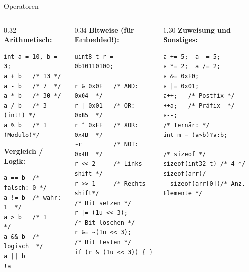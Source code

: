 \documentclass[%
  aspectratio=169,
  10pt
]{beamer}
\begin{document}
\begin{frame}[fragile]{Operatoren}
  \begin{columns}[T]
    \begin{column}{0.32\textwidth}
      \textbf{Arithmetisch:}
\begin{lstlisting}
int a = 10, b = 3;
a + b   /* 13 */
a - b   /* 7  */
a * b   /* 30 */
a / b   /* 3 (int!) */
a % b   /* 1 (Modulo)*/
\end{lstlisting}
      \textbf{Vergleich / Logik:}
\begin{lstlisting}
a == b  /* falsch: 0 */
a != b  /* wahr: 1  */
a > b   /* 1        */
a && b  /* logisch  */
a || b
!a
\end{lstlisting}
    \end{column}
    \begin{column}{0.34\textwidth}
      \textbf{Bitweise (für Embedded!):}
\begin{lstlisting}
uint8_t r = 0b10110100;

r & 0x0F   /* AND:  0x04  */
r | 0x01   /* OR:   0xB5  */
r ^ 0xFF   /* XOR:  0x4B  */
~r         /* NOT:  0x4B  */
r << 2     /* Links shift */
r >> 1     /* Rechts shift*/
/* Bit setzen */
r |= (1u << 3);
/* Bit löschen */
r &= ~(1u << 3);
/* Bit testen */
if (r & (1u << 3)) { }
\end{lstlisting}
    \end{column}
    \begin{column}{0.30\textwidth}
      \textbf{Zuweisung und Sonstiges:}
\begin{lstlisting}
a += 5;  a -= 5;
a *= 2;  a /= 2;
a &= 0xF0;
a |= 0x01;
a++;   /* Postfix */
++a;   /* Präfix  */
a--;
/* Ternär: */
int m = (a>b)?a:b;

/* sizeof */
sizeof(int32_t) /* 4 */
sizeof(arr)/
  sizeof(arr[0])/* Anz. Elemente */
\end{lstlisting}
    \end{column}
  \end{columns}
\end{frame}
\end{document}
